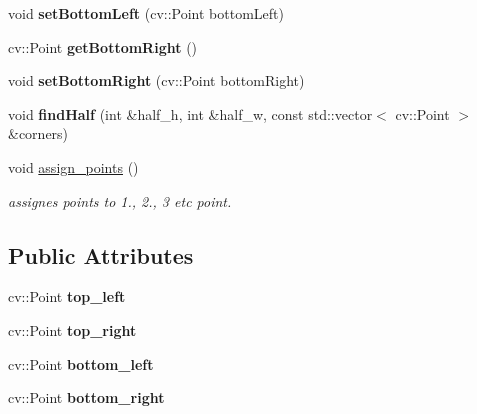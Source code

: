 \begin{DoxyCompactItemize}
\mbox{\label{class_geometry2_d_1_1_rectangle_adbb3a9c4eabc748a1345447c48f7f39a}} 
void {\bfseries set\+Bottom\+Left} (cv\+::\+Point bottom\+Left)
\item 
\mbox{\label{class_geometry2_d_1_1_rectangle_a86f70f7f5fac9bdfc0e9b3d293ae6196}} 
cv\+::\+Point {\bfseries get\+Bottom\+Right} ()
\item 
\mbox{\label{class_geometry2_d_1_1_rectangle_af037850b78e24d8588433fc877008ed3}} 
void {\bfseries set\+Bottom\+Right} (cv\+::\+Point bottom\+Right)
\item 
\mbox{\label{class_geometry2_d_1_1_rectangle_ab4acb2a2f42304eed025b3efded350d0}} 
void {\bfseries find\+Half} (int \&half\+\_\+h, int \&half\+\_\+w, const std\+::vector$<$ cv\+::\+Point $>$ \&corners)
\item 
\mbox{\label{class_geometry2_d_1_1_rectangle_af9a483434ded2dac880fa682d2386dad}} 
void \mbox{\hyperlink{class_geometry2_d_1_1_rectangle_af9a483434ded2dac880fa682d2386dad}{assign\+\_\+points}} ()
\begin{DoxyCompactList}\small\item\em assignes points to 1., 2., 3 etc point. \end{DoxyCompactList}\end{DoxyCompactItemize}
\subsection*{Public Attributes}
\begin{DoxyCompactItemize}
\item 
\mbox{\label{class_geometry2_d_1_1_rectangle_aafa948683645e0038ff747cdbf7941e7}} 
cv\+::\+Point {\bfseries top\+\_\+left}
\item 
\mbox{\label{class_geometry2_d_1_1_rectangle_a36c16fe3933944c63bfb3206363a37da}} 
cv\+::\+Point {\bfseries top\+\_\+right}
\item 
\mbox{\label{class_geometry2_d_1_1_rectangle_ad7407dd1e39e1851c3474da1bde23ee0}} 
cv\+::\+Point {\bfseries bottom\+\_\+left}
\item 
\mbox{\label{class_geometry2_d_1_1_rectangle_ad7063cea41888253546f8f9d44dc4cd4}} 
cv\+::\+Point {\bfseries bottom\+\_\+right}
\end{DoxyCompactItemize}


